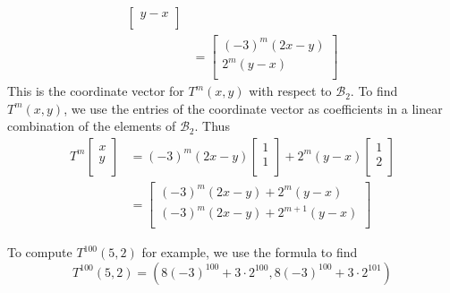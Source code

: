 \documentclass{article}
\begin{document}
\begin{example}
\begin{align*}
\begin{bmatrix}
      y - x\\
    \end{bmatrix}\\
    &=
    \begin{bmatrix}
      (-3)^m (2x - y)\\
      2^m (y - x)\\
    \end{bmatrix}
  \end{align*}
  This is the coordinate vector for $T^m(x, y)$ with respect to $\mathcal{B}_2$. To find $T^m(x, y)$, we use the entries of the coordinate vector as coefficients in a linear combination of the elements of $\mathcal{B}_2$. Thus
  \begin{align*}
    T^m
    \begin{bmatrix}
      x\\y\\
    \end{bmatrix} &= (-3)^m(2x - y)
    \begin{bmatrix}
      1\\1\\
    \end{bmatrix} + 2^m (y - x)
    \begin{bmatrix}
      1\\2\\
    \end{bmatrix}\\
    &=
    \begin{bmatrix}
      (-3)^m (2x - y) + 2^m(y-x)\\
      (-3)^m (2x - y) + 2^{m+1}(y-x)\\
    \end{bmatrix}
  \end{align*}

  To compute $T^{100}(5, 2)$ for example, we use the formula to find \[
    T^{100}(5, 2) = (8(-3)^{100} + 3 \cdot 2^{100}, 8(-3)^{100} + 3 \cdot 2^{101})
  \]
\end{example}
\end{document}
